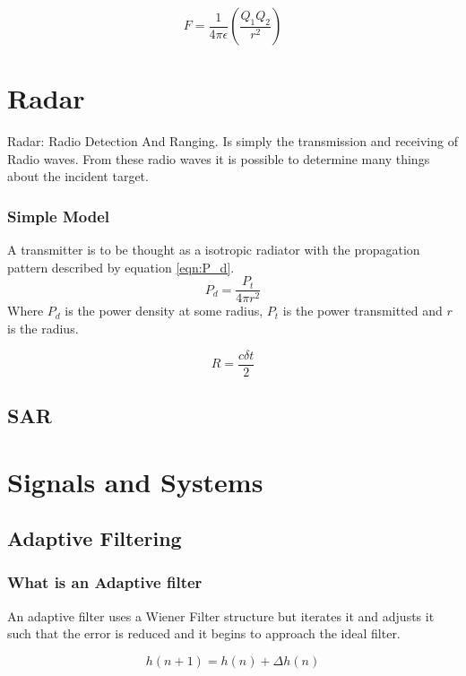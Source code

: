 \begin{equation}
  F = \frac{1}{4\pi\epsilon}\left( \frac{Q_{1}Q_{2}}{r^2} \right)
\end{equation}

\section{Radar}
Radar: Radio Detection And Ranging. Is simply the transmission and receiving of Radio waves. From these radio waves it is possible to determine many things about the incident target.

\subsubsection{Simple Model} 
A transmitter is to be thought as a isotropic radiator with the propagation pattern described by equation \ref{eqn:P_d}.
\begin{equation}
  P_d = \frac{P_t}{4 \pi r^2}
  \label{eqn:P_d}
\end{equation}
Where $P_d$ is the power density at some radius, $P_t$ is the power transmitted and $r$ is the radius.


\begin{equation}
  R = \frac{c \delta t}{2}
\end{equation}
\subsection{SAR}

\section{Signals and Systems}

\subsection{Adaptive Filtering}

\subsubsection{ What is an Adaptive filter}
An adaptive filter uses a Wiener Filter structure but iterates it and adjusts it such that the error is reduced and it begins to approach the ideal filter.

\begin{equation}
  h(n+1) = h(n)+\Delta h(n)
\end{equation}

